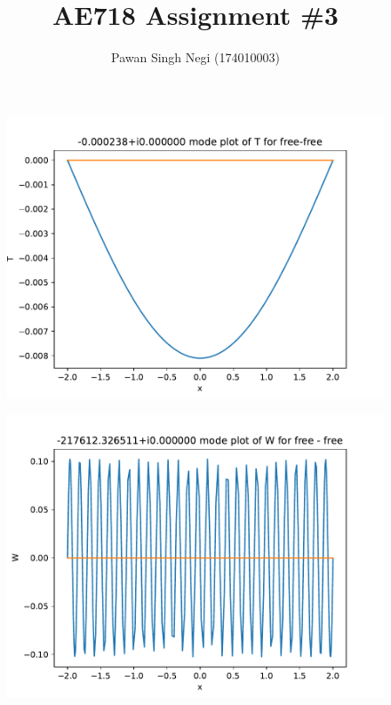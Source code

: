 \documentclass[12pt,a4paper,oneside]{article}
\title{AE718 Assignment \#3}
\author{Pawan Singh Negi (174010003) }
\begin{document}
	\maketitle
	\newpage
        \noindent

          \hspace{5mm}
{\footnotesize
}


	\newpage
        \begin{figure}[h!]
          \centering
          \includegraphics{./free-free_T_plot.pdf}
        \end{figure}

        \begin{figure}[h!]
          \centering
          \includegraphics{./free-free_W_plot.pdf}
        \end{figure}
\end{document}
